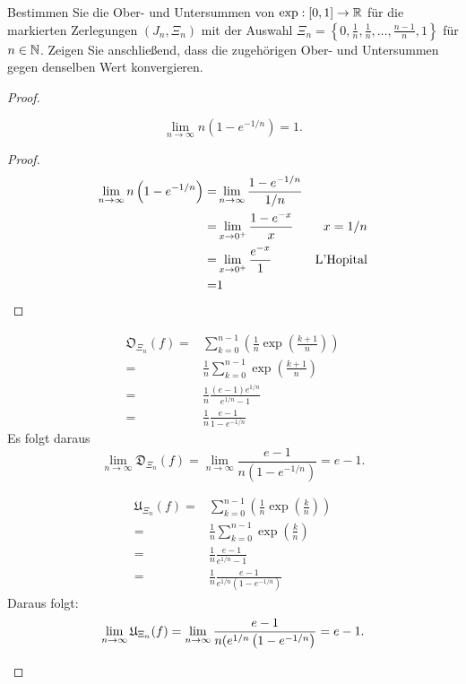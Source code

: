 \begin{Problem}
	Bestimmen Sie die Ober- und Untersummen von $\exp : [0, 1] \to\mathbb{R}$ für die markierten Zerlegungen $(J_n, \Xi_n)$ mit der Auswahl $\Xi_n = \left\{ 0,\frac{1}{n},\frac{1}{n},\dots,\frac{n-1}{n},1 \right\} $ für $n \in \mathbb{N}$. Zeigen Sie anschließend, dass die zugehörigen Ober- und Untersummen gegen denselben Wert konvergieren.
\end{Problem}

\begin{proof}
	\begin{parts}
	\item 
		\begin{Lemma}
			\[\lim_{n \to \infty} n\left( 1-e^{- 1 / n} \right) =1.\]
		\end{Lemma}
		\begin{proof}
			\begin{align*}
				\lim_{n \to \infty} n\left( 1-e^{-1 / n} \right) =&\lim_{n \to \infty} \frac{1 - e^{-1 / n}}{1 / n}\\
				=&\lim_{x \to 0^+} \frac{1-e^{-x}}{x} & x= 1 / n\\
				=&\lim_{x \to 0^+} \frac{e^{-x}}{1}&\text{L'Hopital}\\
				=&1\qedhere
			\end{align*}
		\end{proof}
\begin{align*}
	\mathfrak{O}_{\Xi_n}(f)=&\sum_{k=0}^{n-1} \left( \frac{1}{n}\exp\left( \frac{k+1}{n} \right)  \right)\\ 
	=&\frac{1}{n}\sum_{k=0}^{n-1} \exp\left( \frac{k+1}{n} \right)\\
	=& \frac{1}{n}\frac{(e-1)e^{1 / n}}{e^{1 / n}-1}\\
	=&\frac{1}{n}\frac{e-1}{1-e^{-1 / n}} 
\end{align*}
Es folgt daraus
\[
	\lim_{n \to \infty} \mathfrak{D}_{\Xi_n}(f)=\lim_{n \to \infty} \frac{e-1}{n\left( 1-e^{-1 / n} \right) }=e-1
.\] 
\item 
	\begin{align*}
		\mathfrak{U}_{\Xi_n}(f)=&\sum_{k=0}^{n-1} \left( \frac{1}{n}\exp\left( \frac{k}{n} \right)  \right) \\
		=&\frac{1}{n}\sum_{k=0}^{n-1} \exp\left( \frac{k}{n} \right)\\
		=&\frac{1}{n}\frac{e-1}{e^{1 / n}-1}\\
		=&\frac{1}{n}\frac{e-1}{e^{1 / n}\left( 1-e^{- 1 / n} \right) }
	\end{align*}
	Daraus folgt:
	\[
		\lim_{n \to \infty} \mathfrak{U}_{\Xi_n}(f)=\lim_{n \to \infty} \frac{e-1}{n(e^{1 / n}\left( 1-e^{-1 / n} \right) }=e-1
	.\qedhere\] 
	\end{parts}
\end{proof}
